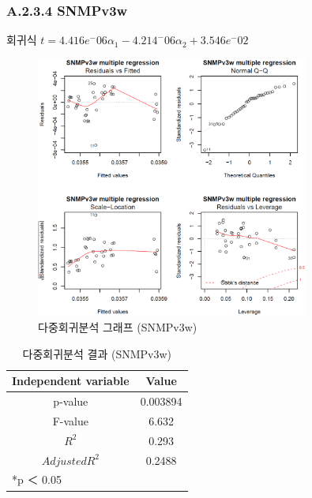 \documentclass[11pt
  , a4paper
  , article
  , oneside
]{memoir}
\begin{document}
\subsubsection{A.2.3.4 SNMPv3w}
\centering 회귀식 $ t=4.416e^-06\alpha_1 - 4.214^-06\alpha_2 + 3.546e^-02$ 
   　
\begin{figure}[h!]
  \centering
  \includegraphics[width=0.8\textwidth]{./images/v3w.eps}
  \caption{다중회귀분석 그래프 (SNMPv3w)}
\end{figure}

\begin{table}[!h]
\begin{center}
\begin{tabular}{c|c}\hline
Independent variable & Value  \\ \hline\hline
p-value &  0.003894\\ 
F-value &  6.632\\ 
$  R^2  $ &  0.293\\ 
$ Adjusted R^2 $ & 0.2488 \\ \hline
\multicolumn{2}{l}{*p ＜ 0.05} \\ \hline\hline
\end{tabular}
\caption{다중회귀분석 결과 (SNMPv3w)}
\end{center}
\end{table} 
\clearpage


\end{document}
